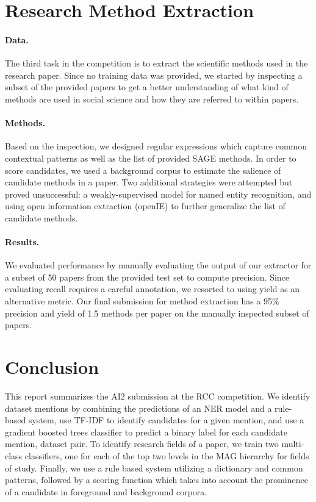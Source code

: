 \section{Research Method Extraction}
\label{sec:methods}
\paragraph{Data.}
The third task in the competition is to extract the scientific methods used in the research paper.
Since no training data was provided, we started by inspecting a subset of the provided papers to get a better understanding of what kind of methods are used in social science and how they are referred to within papers. 

\paragraph{Methods.}
Based on the inspection, we designed regular expressions which capture common contextual patterns as well as the list of provided SAGE methods. 
In order to score candidates, we used a background corpus to estimate the salience of candidate methods in a paper.
Two additional strategies were attempted but proved unsuccessful: a weakly-supervised model for named entity recognition, and using open information extraction (openIE) to further generalize the list of candidate methods.

\paragraph{Results.}
We evaluated performance by manually evaluating the output of our extractor for a subset of 50 papers from the provided test set to compute precision. 
Since evaluating recall requires a careful annotation, we resorted to using yield as an alternative metric.
Our final submission for method extraction has a 95\% precision and yield of 1.5 methods per paper on the manually inspected subset of papers.

\section{Conclusion}
This report summarizes the AI2 submission at the RCC competition.
We identify dataset mentions by combining the predictions of an NER model and a rule-based system, use TF-IDF to identify candidates for a given mention, and use a gradient boosted trees classifier to predict a binary label for each candidate mention, dataset pair.
To identify research fields of a paper, we train two multi-class classifiers, one for each of the top two levels in the MAG hierarchy for fields of study.
Finally, we use a rule based system utilizing a dictionary and common patterns, followed by a scoring function which takes into account the prominence of a candidate in foreground and background corpora.

